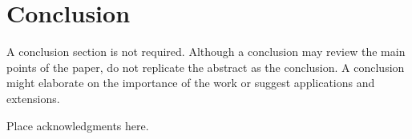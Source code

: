 \documentclass{ifacconf}
\begin{document}





\section{Conclusion}

A conclusion section is not required. Although a conclusion may review
the main points of the paper, do not replicate the abstract as the
conclusion. A conclusion might elaborate on the importance of the work
or suggest applications and extensions.

\begin{ack}
Place acknowledgments here.
\end{ack}

                                                   

\end{document}
